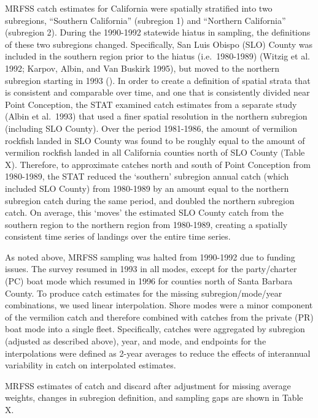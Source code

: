 \documentclass[11pt,
  english,
  a4paper,
]{article}
\begin{document}
MRFSS catch estimates for California were spatially stratified into two subregions, ``Southern California'' (subregion 1) and ``Northern California'' (subregion 2). During the 1990-1992 statewide hiatus in sampling, the definitions of these two subregions changed. Specifically, San Luis Obispo (SLO) County was included in the southern region prior to the hiatus (i.e.~1980-1989) {(Witzig et al. 1992; Karpov, Albin, and Van Buskirk 1995)\leavevmode\tagmcend\tagstructend}, but moved to the northern subregion starting in 1993 (). In order to create a definition of spatial strata that is consistent and comparable over time, and one that is consistently divided near Point Conception, the STAT examined catch estimates from a separate study (Albin et al.~1993) that used a finer spatial resolution in the northern subregion (including SLO County). Over the period 1981-1986, the amount of vermilion rockfish landed in SLO County was found to be roughly equal to the amount of vermilion rockfish landed in all California counties north of SLO County (Table X). Therefore, to approximate catches north and south of Point Conception from 1980-1989, the STAT reduced the `southern' subregion annual catch (which included SLO County) from 1980-1989 by an amount equal to the northern subregion catch during the same period, and doubled the northern subregion catch. On average, this `moves' the estimated SLO County catch from the southern region to the northern region from 1980-1989, creating a spatially consistent time series of landings over the entire time series.

As noted above, MRFSS sampling was halted from 1990-1992 due to funding issues. The survey resumed in 1993 in all modes, except for the party/charter (PC) boat mode which resumed in 1996 for counties north of Santa Barbara County. To produce catch estimates for the missing subregion/mode/year combinations, we used linear interpolation. Shore modes were a minor component of the vermilion catch and therefore combined with catches from the private (PR) boat mode into a single fleet. Specifically, catches were aggregated by subregion (adjusted as described above), year, and mode, and endpoints for the interpolations were defined as 2-year averages to reduce the effects of interannual variability in catch on interpolated estimates.

MRFSS estimates of catch and discard after adjustment for missing average weights, changes in subregion definition, and sampling gaps are shown in Table X.
\end{document}

